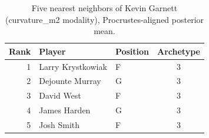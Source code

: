 \begin{table}[htbp]
  \centering\small
  \begin{tabular}{rllc}
    \toprule
    Rank & Player & Position & Archetype \\
    \midrule
    1 & Larry Krystkowiak & F & 3 \\
    2 & Dejounte Murray & G & 3 \\
    3 & David West & F & 3 \\
    4 & James Harden & G & 3 \\
    5 & Josh Smith & F & 3 \\
    \bottomrule
  \end{tabular}
  \caption{Five nearest neighbors of Kevin Garnett (curvature_m2 modality), Procrustes-aligned posterior mean.}
  \label{tab:Kevin_Garnett_neighbors_curvature_m2}
\end{table}


